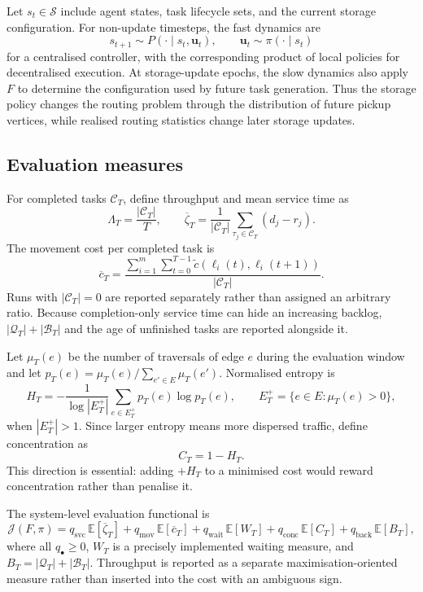 \documentclass[../main.tex]{subfiles}
\begin{document}
Let \(s_t\in\mathcal{S}\) include agent states, task lifecycle sets, and the
current storage configuration. For non-update timesteps, the fast dynamics are
\[
s_{t+1}\sim P(\cdot\mid s_t,\mathbf{u}_t),
\qquad
\mathbf{u}_t\sim\pi(\cdot\mid s_t)
\]
for a centralised controller, with the corresponding product of local policies
for decentralised execution. At storage-update epochs, the slow dynamics also
apply \(F\) to determine the configuration used by future task generation.
Thus the storage policy changes the routing problem through the distribution of
future pickup vertices, while realised routing statistics change later storage
updates.

\subsection{Evaluation measures}

For completed tasks \(\mathcal{C}_T\), define throughput and mean service time
as
\[
\Lambda_T=\frac{|\mathcal{C}_T|}{T},
\qquad
\overline\zeta_T=
\frac{1}{|\mathcal{C}_T|}
\sum_{\tau_j\in\mathcal{C}_T}(d_j-r_j).
\]
The movement cost per completed task is
\[
\overline c_T=
\frac{
\sum_{i=1}^{m}\sum_{t=0}^{T-1}
\widetilde c(\ell_i(t),\ell_i(t+1))
}{|\mathcal{C}_T|}.
\]
Runs with \(|\mathcal{C}_T|=0\) are reported separately rather than assigned an
arbitrary ratio. Because completion-only service time can hide an increasing
backlog, \(|\mathcal{Q}_T|+|\mathcal{B}_T|\) and the age of unfinished tasks are
reported alongside it.

Let \(\mu_T(e)\) be the number of traversals of edge \(e\) during the evaluation
window and let
\(p_T(e)=\mu_T(e)/\sum_{e'\in E}\mu_T(e')\). Normalised entropy is
\[
H_T=-\frac{1}{\log |E^+_T|}
\sum_{e\in E^+_T}p_T(e)\log p_T(e),
\qquad
E^+_T=\{e\in E:\mu_T(e)>0\},
\]
when \(|E^+_T|>1\). Since larger entropy means more dispersed traffic, define
concentration as
\[
C_T=1-H_T.
\]
This direction is essential: adding \(+H_T\) to a minimised cost would reward
concentration rather than penalise it.

The system-level evaluation functional is
\[
\mathcal{J}(F,\pi)=
q_{\mathrm{svc}}\,\mathbb{E}[\overline\zeta_T]
+q_{\mathrm{mov}}\,\mathbb{E}[\overline c_T]
+q_{\mathrm{wait}}\,\mathbb{E}[W_T]
+q_{\mathrm{conc}}\,\mathbb{E}[C_T]
+q_{\mathrm{back}}\,\mathbb{E}[B_T],
\]
where all \(q_\bullet\geq0\), \(W_T\) is a precisely implemented waiting
measure, and \(B_T=|\mathcal{Q}_T|+|\mathcal{B}_T|\). Throughput is reported as
a separate maximisation-oriented measure rather than inserted into the cost
with an ambiguous sign.
\end{document}
